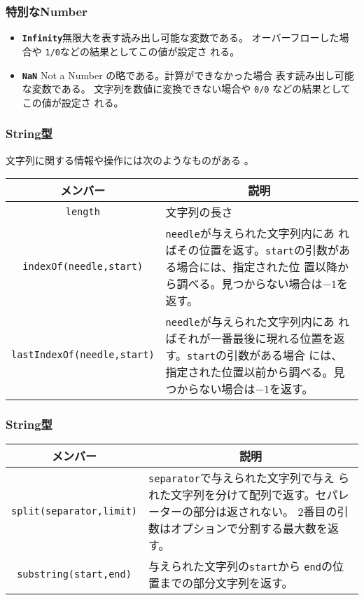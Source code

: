 \begin{frame}[containsverbatim]
 \frametitle{特別なNumber}
\begin{itemize}
 \item {\bfseries \Verb+Infinity+}無限大を表す読み出し可能な変数である。
       オーバーフローした場合や \Verb+1/0+などの結果としてこの値が設定さ
       れる。
 \item {\bfseries \Verb+NaN+} Not a Number の略である。計算ができなかった場合
       表す読み出し可能な変数である。
       文字列を数値に変換できない場合や \Verb+0/0+ などの結果としてこの値が設定さ
       れる。
\end{itemize}
\end{frame}
\begin{frame}[containsverbatim]
 \frametitle{String型}
文字列に関する情報や操作には次のようなものがある 。
\begin{center}
 \begin{tabular}{|c|m{}|}\hline
 メンバー&\multicolumn{1}{c|}{説明} \\\hline
  \Verb+length+ &文字列の長さ\\ \hline
\Verb+indexOf(needle,start)+& \Verb+needle+が与えられた文字列内にあ
      ればその位置を返す。\Verb+start+の引数がある場合には、指定された位
      置以降から調べる。見つからない場合は$-1$を返す。\\\hline
\Verb+lastIndexOf(needle,start)+& \Verb+needle+が与えられた文字列内にあ
      ればそれが一番最後に現れる位置を返す。\Verb+start+の引数がある場合
      には、指定された位置以前から調べる。見つからない場合は$-1$を返す。\\\hline
\end{tabular}
\end{center}
\end{frame}
\begin{frame}[containsverbatim]
 \frametitle{String型}
\begin{center}
 \begin{tabular}{|c|m{}|}\hline
 メンバー&\multicolumn{1}{c|}{説明} \\\hline
  \Verb+split(separator,limit)+&\Verb+separator+で与えられた文字列で与え
      られた文字列を分けて配列で返す。セパレーターの部分は返されない。
      2番目の引数はオプションで分割する最大数を返す。\\ \hline
  \Verb+substring(start,end)+&与えられた文字列の\Verb+start+から
      \Verb+end+の位置までの部分文字列を返す。\\ \hline
\end{tabular}
\end{center}
\end{frame}
